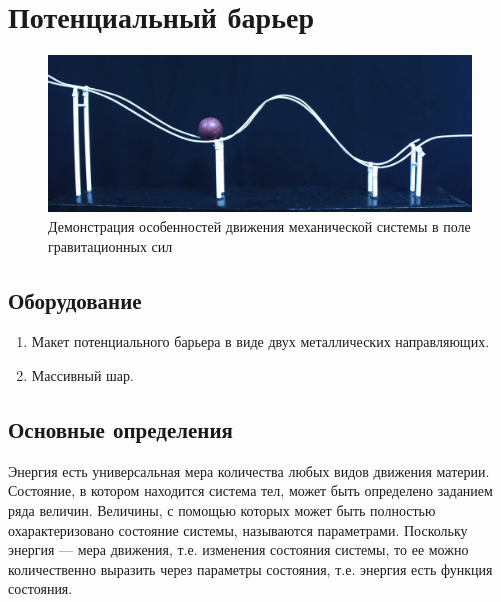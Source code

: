 \documentclass[All.tex]{subfiles}
\begin{document}
	

		\section{Потенциальный барьер}
		

\begin{figure}[H] 	
	\centering 	
	\includegraphics[width=0.9\linewidth]{barrier-1.png}
	\caption{Демонстрация особенностей движения механической системы в поле гравитационных сил}
	\label{barrier-1}
\end{figure}
	
	\subsection*{\textcolor{PineGreen}{Оборудование}}

		\begin{enumerate}
			\item Макет потенциального барьера в виде двух металлических направляющих.
			\item Массивный шар.
		\end{enumerate}
	
		\subsection*{\textcolor{PineGreen}{Основные определения}}
		
		Энергия есть универсальная мера количества любых видов движения материи.
		Состояние, в котором находится система тел, может быть определено заданием ряда величин.
		Величины, с помощью которых может быть полностью охарактеризовано состояние системы, называются параметрами.
		Поскольку энергия — мера движения, т.е. изменения состояния системы, то ее можно количественно выразить через параметры состояния, т.е. энергия есть функция состояния.
		
\end{document}
